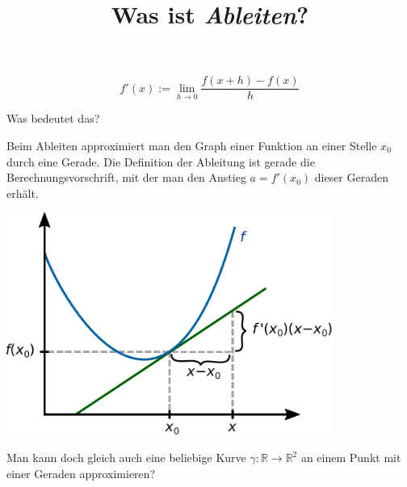 \documentclass{beamer}
\title{Was ist \emph{Ableiten}?}
\date{}
\newcommand{\R}{\mathbb R}
\begin{document}
\maketitle


\begin{frame}

\begin{Definition}[Ableitung]
\[f'(x) := \lim_{h\to 0}\frac{f(x+h)-f(x)}{h}\]
\end{Definition}

\end{frame}


\begin{frame}
Was bedeutet das?
\end{frame}

\begin{frame}
Beim Ableiten approximiert man den Graph einer Funktion an einer
Stelle $x_0$ durch eine Gerade. Die Definition der Ableitung ist
gerade die Berechnungsvorschrift, mit der man den Anstieg $a=f'(x_0)$
dieser Geraden erhält.
\end{frame}

\begin{frame}
\begin{center}
\includegraphics[width=0.8\textwidth]{img/Ableitung.pdf}
\end{center}
\end{frame}

\begin{frame}
Man kann doch gleich auch eine beliebige Kurve $\gamma\colon\R\to\R^2$
an einem Punkt mit einer Geraden approximieren?
\end{frame}
\end{document}
